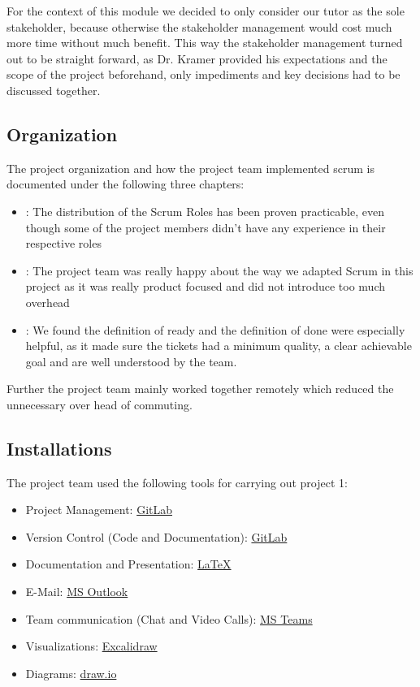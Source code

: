 For the context of this module we decided to only consider our tutor as the sole stakeholder,
because otherwise the stakeholder management would cost much more time without much benefit.
This way the stakeholder management turned out to be straight forward, as Dr. Kramer provided his expectations and the
scope of the project beforehand, only impediments and key decisions had to be discussed together.

\subsection{Organization}\label{subsec:organisation}
The project organization and how the project team implemented scrum is documented under the following three chapters:

\begin{itemize}
    \item {}: The distribution of the Scrum Roles has been proven practicable, even though some of the project members didn't have any experience in their respective roles
    \item {}: The project team was really happy about the way we adapted Scrum in this project as it was really product focused and did not introduce too much overhead
    \item {}: We found the definition of ready and the definition of done were especially helpful, as it made sure the tickets had a minimum quality, a clear achievable goal and are well understood by the team.
\end{itemize}

Further the project team mainly worked together remotely which reduced the unnecessary over head of commuting.

\subsection{Installations}\label{subsec:installations}
The project team used the following tools for carrying out project 1:
\begin{itemize}
    \item Project Management: \href{https://about.gitlab.com/}{GitLab}
    \item Version Control (Code and Documentation): \href{https://about.gitlab.com/}{GitLab}
    \item Documentation and Presentation: \href{https://www.latex-project.org/}{LaTeX}
    \item E-Mail: \href{https://www.microsoft.com/en-us/microsoft-365/outlook/email-and-calendar-software-microsoft-outlook}{MS Outlook}
    \item Team communication (Chat and Video Calls): \href{https://www.microsoft.com/en-us/microsoft-teams/group-chat-software}{MS Teams}
    \item Visualizations: \href{https://excalidraw.com/}{Excalidraw}
    \item Diagrams: \href{https://www.drawio.com/}{draw.io}
\end{itemize}
